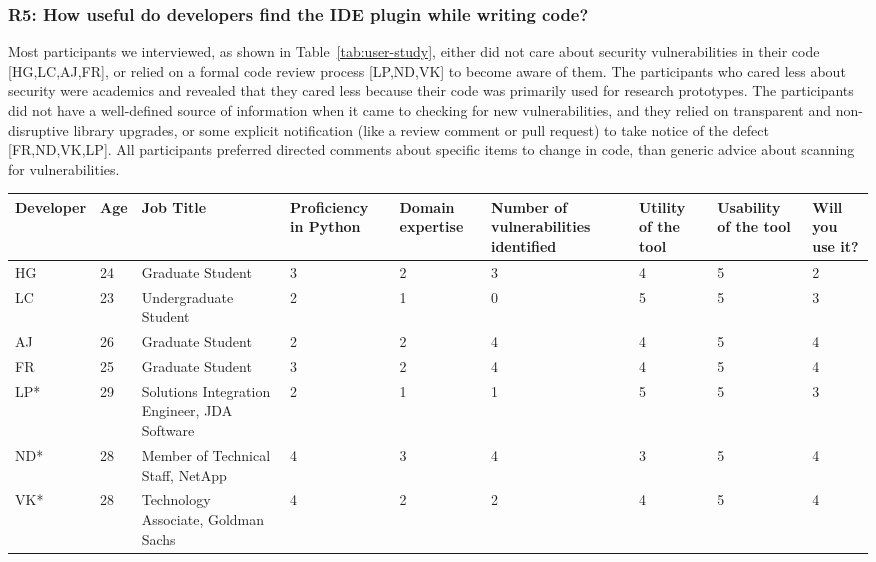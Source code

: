 \subsubsection{R5: How useful do developers find the IDE plugin while writing code?}


Most participants we interviewed, as shown in Table~\ref{tab:user-study}, either did not care about security vulnerabilities in their code [HG,LC,AJ,FR], or relied on a formal code review process [LP,ND,VK] to become aware of them. The participants who cared less about security were academics and revealed that they cared less because their code was primarily used for research prototypes. The participants did not have a well-defined source of information when it came to checking for new vulnerabilities, and they relied on transparent and non-disruptive library upgrades, or some explicit notification (like a review comment or pull request) to take notice of the defect [FR,ND,VK,LP].  All participants preferred directed comments about specific items to change in code, than generic advice about scanning for vulnerabilities. 

\begin{table*}[!h]
\small
  \centering
  \begin{tabular}{|p{}|p{}|p{}|p{}|p{}|p{}|p{}|p{}|p{}|}
    \hline
Developer & Age & Job Title & Proficiency in Python & Domain expertise & Number of vulnerabilities identified & Utility of the tool & Usability of the tool & Will you use it? \\
\hline
\hline
HG & 24 & Graduate Student & 3 & 2 & 3 & 4 & 5 & 2 \\
\hline
LC & 23 & Undergraduate Student & 2 & 1 & 0 & 5 & 5 & 3 \\
\hline
AJ & 26 & Graduate Student & 2 & 2 & 4 & 4 & 5 & 4 \\
\hline
FR & 25 & Graduate Student & 3 & 2 & 4 & 4 & 5 & 4 \\
\hline
LP* & 29 & Solutions Integration Engineer, JDA Software & 2 & 1 & 1 & 5 & 5 & 3 \\
\hline
ND* & 28 & Member of Technical Staff, NetApp & 4 & 3 & 4 & 3 & 5 & 4 \\
\hline
VK* & 28 & Technology Associate, Goldman Sachs & 4 & 2 & 2 & 4 & 5 & 4 \\
\hline
  \end{tabular}
  \caption{User demographics data. Participants marked with an asterix(*) were interviewed remotely over Skype. The ratings are on a scale of 1 to 5, where 1 is the worst and 5 is the best possible score for that question.} 
  \label{tab:user-study}
\end{table*}


